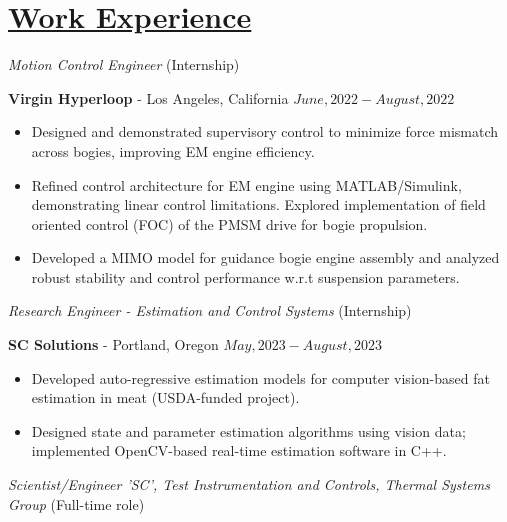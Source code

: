 \section*{\underline{Work Experience}}
\noindent \textit{Motion Control Engineer } (Internship)

\textbf{Virgin Hyperloop} - Los Angeles, California \hfill $June, 2022  - August, 2022$

\begin{itemize}
        \item Designed and demonstrated supervisory control to minimize force mismatch across bogies, improving EM engine efficiency.
        \item Refined control architecture for EM engine using MATLAB/Simulink, demonstrating linear control limitations. Explored implementation of field oriented control (FOC) of the PMSM drive for bogie propulsion.
        \item Developed a MIMO model for guidance bogie engine assembly and analyzed robust stability and control performance w.r.t suspension parameters.
\end{itemize}

\medskip

\noindent\textit{Research Engineer  - Estimation and Control Systems} (Internship)

\textbf{SC Solutions} - Portland, Oregon \hfill $May, 2023 - August, 2023$

\begin{itemize}
    \item Developed auto-regressive estimation models for computer vision-based fat estimation in meat (USDA-funded project).
    \item Designed state and parameter estimation algorithms using vision data; implemented OpenCV-based real-time estimation software in C++.
\end{itemize}

\medskip

\noindent\textit{Scientist/Engineer 'SC', Test Instrumentation and Controls, Thermal Systems Group} (Full-time role)

